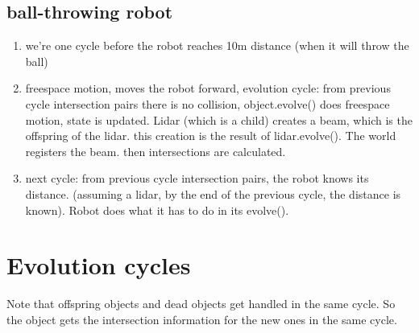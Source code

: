 \documentclass[a4paper]{report}
\begin{document}
\subsection{ball-throwing robot}
\begin{enumerate}
	\item we're one cycle before the robot reaches 10m distance (when it will throw the ball)
	\item freespace motion, moves the robot forward, evolution cycle: from previous cycle intersection pairs there is no collision, object.evolve() does freespace motion, state is updated. Lidar (which is a child) creates a beam, which is the offspring of the lidar. this creation is the result of lidar.evolve(). The world registers the beam. then intersections are calculated.
	\item next cycle: from previous cycle intersection pairs, the robot knows its distance. (assuming a lidar, by the end of the previous cycle, the distance is known). Robot does what it has to do in its evolve(). 
\end{enumerate}


\section{Evolution cycles}
Note that offspring objects and dead objects get handled in the same cycle. So the object gets the intersection information for the new ones in the same cycle.
\end{document}
